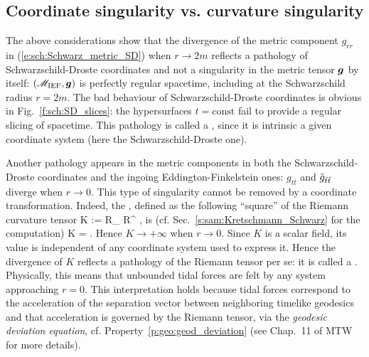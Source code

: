 \subsection{Coordinate singularity vs. curvature singularity}
\label{s:sch:singularities}

The above considerations show that the divergence of the metric
component $g_{rr}$ in (\ref{e:sch:Schwarz_metric_SD}) when $r\rightarrow 2m$
reflects a pathology of Schwarzschild-Droste coordinates and not a singularity
in the metric tensor $\bm{g}$ by itself: $(\mathscr{M}_{\rm IEF}, \bm{g})$ is perfectly
regular spacetime, including at the Schwarzschild radius $r=2m$.
The bad behaviour of Schwarzschild-Droste coordinates is obvious in Fig.~\ref{f:sch:SD_slices}: the hypersurfaces
$t=\mathrm{const}$ fail to provide a regular slicing of spacetime.
This pathology is called a
, since it is intrinsic a given coordinate system
(here the Schwarzschild-Droste one).

Another pathology appears in the metric components in both the Schwarzschild-Droste coordinates and the ingoing Eddington-Finkelstein ones: $g_{tt}$ and $\tilde{g}_{{\tilde t}{\tilde t}}$ diverge when $r\rightarrow 0$. This type of singularity
cannot be removed by a coordinate transformation. Indeed, the
, defined as the
following ``square'' of the Riemann curvature tensor
\be \label{e:sch:def_Kretschmann}
    K := R_{\mu\nu\rho\sigma} R^{\mu\nu\rho\sigma} ,
\ee
is (cf. Sec.~\ref{s:sam:Kretschmann_Schwarz} for the computation)
\be \label{e:sch:value_Kretschmann}
    K =  .
\ee
Hence $K\rightarrow +\infty$ when $r\rightarrow 0$. Since $K$ is a scalar
field, its value is independent of any coordinate system used to express it.
Hence the divergence of $K$ reflects a pathology of the Riemann tensor
per se: it is called a
.
Physically, this means that unbounded tidal forces are felt by any system
approaching $r=0$. This interpretation holds because
tidal forces correspond to
the acceleration of the separation vector between
neighboring timelike geodesics and that acceleration is
governed by the Riemann tensor,
via the \emph{geodesic deviation equation}, cf. Property~\ref{p:geo:geod_deviation} (see Chap.~11 of MTW \cite{MisneTW73} for more details).



